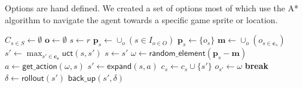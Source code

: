 Options are hand defined. We created a set of options most of which use the A*
algorithm to navigate the agent towards a specific game sprite or location.

\begin{algorithm}
	\caption{$\mathsf{O-MCTS}(O, r, t, d)$}
	\label{alg:omcts}
	\begin{algorithmic}[1]
		\State $C_{s \in S} \gets \emptyset$ 
		\State $\mathbf{o} \gets \emptyset$ 
		 \label{alg:omcts:mainloop}
			\State $s \gets r$ 
			 \label{alg:omcts:innerloop}
			 \label{alg:omcts:sp} 
				\State $\mathbf{p}_s \gets \cup_o (s \in I_{o \in O})$ 
				\Else
					\State $\mathbf{p}_s \gets \{o_s\}$ 
				\EndIf \label{alg:omcts:ep}
				\State $\mathbf{m} \gets \cup_o (o_{s \in \mathbf{c}_s})$ 
				 
					\State $s' \gets \max_{s' \in \mathbf{c_s}} \mathsf{uct}(s, s')$ \label{alg:omcts:uct} 
					\State $s \gets s'$ \label{alg:omcts:ss} 
				\Else \label{alg:omcts:sexpand}
					\State $\omega \gets \mathsf{random\_element}(\mathbf{p}_s - \mathbf{m})$ 
					\State $a \gets \mathsf{get\_action}(\omega, s)$ 
					\State $s' \gets \mathsf{expand}(s, a)$ 
					\State $c_s \gets c_s \cup \{s'\}$ 
					\State $o_{s'} \gets \omega$
					\State \textbf{break} \label{alg:omcts:break}
				\EndIf \label{alg:omcts:eexpand}
			\EndWhile
			\State $\delta \gets \mathsf{rollout}(s')$ \label{alg:omcts:rollout}
			\State $\mathsf{back\_up}(s', \delta)$ \label{alg:omcts:backup}
		\EndWhile
		\State {}
	\end{algorithmic}
\end{algorithm}


